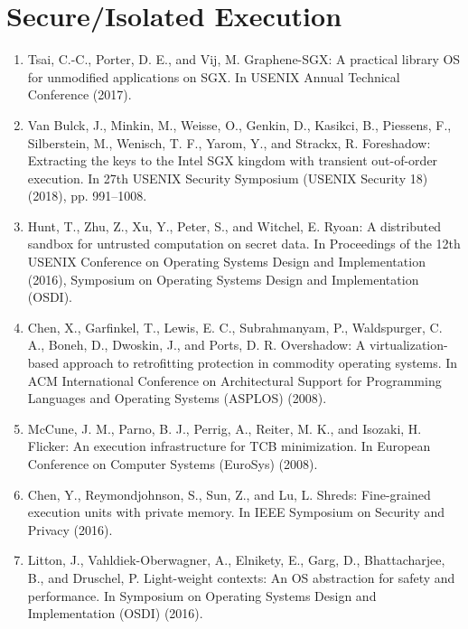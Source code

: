 \section{Secure/Isolated Execution}

\begin{enumerate}[resume]
\item  Tsai, C.-C., Porter, D. E., and Vij, M. Graphene-SGX: A practical library OS for unmodified applications on SGX. In USENIX Annual Technical Conference (2017).
\item Van Bulck, J., Minkin, M., Weisse, O., Genkin, D., Kasikci, B., Piessens, F., Silberstein, M., Wenisch, T. F., Yarom, Y., and Strackx, R. Foreshadow: Extracting the keys to the Intel SGX kingdom with transient out-of-order execution. In 27th USENIX Security Symposium (USENIX Security 18) (2018), pp. 991–1008.
\item Hunt, T., Zhu, Z., Xu, Y., Peter, S., and Witchel, E. Ryoan: A distributed sandbox for untrusted computation on secret data. In Proceedings of the 12th USENIX Conference on Operating Systems Design and Implementation (2016), Symposium on Operating Systems Design and Implementation (OSDI).
\item Chen, X., Garfinkel, T., Lewis, E. C., Subrahmanyam, P., Waldspurger, C. A., Boneh, D., Dwoskin, J., and Ports, D. R. Overshadow: A virtualization-based approach to retrofitting protection in commodity operating systems. In ACM International Conference on Architectural Support for Programming Languages and Operating Systems (ASPLOS) (2008).
\item McCune, J. M., Parno, B. J., Perrig, A., Reiter, M. K., and Isozaki, H. Flicker: An execution infrastructure for TCB minimization. In European Conference on Computer Systems (EuroSys) (2008).
\item  Chen, Y., Reymondjohnson, S., Sun, Z., and Lu, L. Shreds: Fine-grained execution units with private memory. In IEEE Symposium on Security and Privacy (2016).
\item  Litton, J., Vahldiek-Oberwagner, A., Elnikety, E., Garg, D., Bhattacharjee, B., and Druschel, P. Light-weight contexts: An OS abstraction for safety and performance. In Symposium on Operating Systems Design and Implementation (OSDI) (2016).
\end{enumerate}

